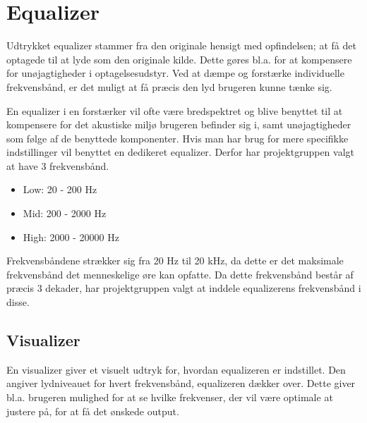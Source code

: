 \section{Equalizer}
\label{equalizer}
Udtrykket equalizer stammer fra den originale hensigt med opfindelsen; at få det optagede til at lyde som den originale kilde. Dette gøres bl.a. for at kompensere for unøjagtigheder i optagelsesudstyr. Ved at dæmpe og forstærke individuelle frekvensbånd, er det muligt at få præcis den lyd brugeren kunne tænke sig. 

En equalizer i en forstærker vil ofte være bredspektret og blive benyttet til at kompensere for det akustiske miljø brugeren befinder sig i, samt unøjagtigheder som følge af de benyttede komponenter. Hvis man har brug for mere specifikke indstillinger vil benyttet en dedikeret equalizer. Derfor har projektgruppen valgt at have 3 frekvensbånd.

\begin{itemize}
\item Low: 20 - 200 Hz
\item Mid: 200 - 2000 Hz
\item High: 2000 - 20000 Hz
\end{itemize}

Frekvensbåndene strækker sig fra 20 Hz til 20 kHz, da dette er det maksimale frekvensbånd det menneskelige øre kan opfatte. Da dette frekvensbånd består af præcis 3 dekader, har projektgruppen valgt at inddele equalizerens frekvensbånd i disse.

\subsection{Visualizer}
En visualizer giver et visuelt udtryk for, hvordan equalizeren er indstillet. Den angiver lydniveauet for hvert frekvensbånd, equalizeren dækker over. Dette giver bl.a. brugeren mulighed for at se hvilke frekvenser, der vil være optimale at justere på, for at få det ønskede output.